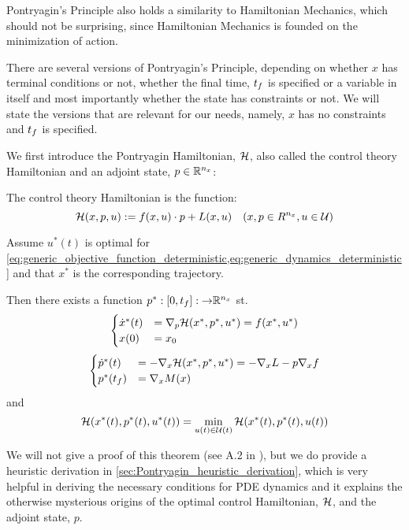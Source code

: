 Pontryagin's Principle also holds a similarity to Hamiltonian Mechanics, which
should not be surprising, since Hamiltonian Mechanics is founded on
the minimization of action.

There are several versions of Pontryagin's Principle, depending on whether $x$ has
terminal conditions or not, whether the final time, ${ t_f }$ is specified or a
variable in itself and most importantly whether the state has constraints or
not. We will state the versions that are relevant for our needs, namely, $x$ has
no constraints and ${ t_f }$ is specified.

We first introduce the Pontryagin Hamiltonian, $\H$, also called the control
theory Hamiltonian and an adjoint state, $p \in { \mathbb{R} }^{n_x}$:
\begin{defn} [$\H$] The control theory Hamiltonian is the function:
$$
{ \mathcal{H} }(x,p, u) := f(x,u) \cdot p + L(x,u) \quad (x,p \in R^{n_x}, u \in { \mathcal{U} })
$$ 
\end{defn}

\begin{thm} Assume $u^*(t)$ is
optimal for
\cref{eq:generic_objective_function_deterministic,eq:generic_dynamics_deterministic}
and that $x^*$ is the corresponding trajectory. 

Then there exists a function $p^*:[0,{ t_f }]:{\rightarrow} { \mathbb{R} }^{n_x}$ st.
\begin{equation}
\begin{cases}
\dot{x}^*(t) &=  { \nabla }_p { \mathcal{H} }(x^*,p^*, u^*) = f(x^*, u^*)
\\
x(0) &= x_0
\end{cases}
\label{eq:pontryagin_state_ode}
\end{equation}
\begin{equation}
\begin{cases}
\dot{p}^*(t) &= -{ \nabla }_x { \mathcal{H} }(x^*,p^*, u^*) = -{ \nabla }_xL - p { \nabla }_x f
\\
p^*({ t_f }) &= { \nabla }_x M(x)
\end{cases}
\label{eq:pontryagin_adjoint_ode} 
\end{equation}
and
\begin{equation}
{ \mathcal{H} }(x^*(t), p^*(t), u^*(t)) = \min_{u(t) \in { \mathcal{U} }(t)}  { \mathcal{H} }(x^*(t), p^*(t),
u(t))
\label{eq:pontryaginH_optimality_condition} 
\end{equation}
\end{thm}
We will not give a proof of this theorem (see A.2 in \cite{Evansb}),
but we do provide a heuristic derivation in 
\cref{sec:Pontryagin_heuristic_derivation}, which is very helpful in deriving
the necessary conditions for PDE dynamics and it explains the otherwise
mysterious origins of the optimal control Hamiltonian, $\H$, and the adjoint
state, $p$.

